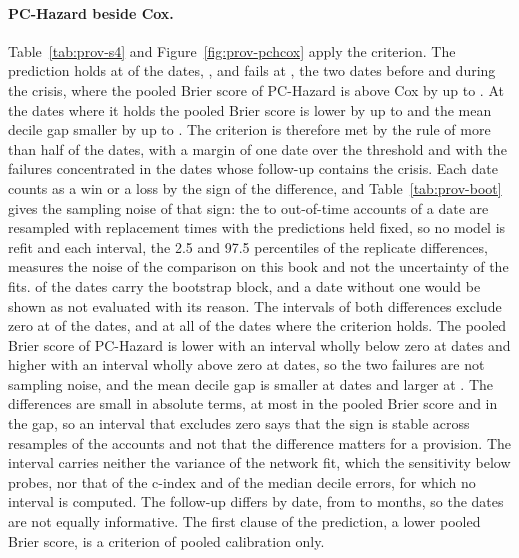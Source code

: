 \paragraph{PC-Hazard beside Cox.} Table~\ref{tab:prov-s4} and Figure~\ref{fig:prov-pchcox} apply the criterion. The prediction holds at \pvDatesHold{} of the \pvDatesTotal{} dates, \pvHoldDates{}, and fails at \pvFailDates{}, the two dates before and during the crisis, where the pooled Brier score of PC-Hazard is above Cox by up to \pvPbsWorseMax{}. At the dates where it holds the pooled Brier score is lower by up to
\pvPbsBetterMax{} and the mean decile gap smaller by up to \pvGapBetterMax{}. The criterion is therefore met by the rule of more than half of the dates, with a margin of one date over the threshold and with the failures concentrated in the dates whose follow-up contains the crisis. Each date counts as a win or a loss by the sign of the difference, and Table~\ref{tab:prov-boot} gives the sampling noise of that sign: the \pvBootAccountsMin{} to \pvBootAccountsMax{} out-of-time accounts of a date are resampled with replacement \pvBootReplicates{} times with the predictions held fixed, so no model is refit and each interval, the 2.5 and 97.5 percentiles of the replicate differences, measures the noise of the comparison on this book and not the uncertainty of the fits. \pvBootEvaluated{} of the \pvBootDates{} dates carry the bootstrap block, and a date without one would be shown as not evaluated with its reason. The intervals of both differences exclude zero at \pvBootBoth{} of the \pvDatesTotal{} dates, and at all \pvBootHoldsExcl{} of the \pvBootHolds{} dates where the criterion holds. The pooled Brier score of PC-Hazard is lower with an interval wholly below zero at \pvBootIbsBetter{} dates and higher with an interval wholly above zero at \pvBootIbsWorse{} dates, so the two failures are not sampling noise, and the mean decile gap is smaller at \pvBootGapBetter{} dates and larger at \pvBootGapWorse{}. The differences are small in absolute terms, at most \pvBootIbsAbsMax{} in the pooled Brier score and \pvBootGapAbsMax{} in the gap, so an interval that excludes zero says that the sign is stable across resamples of the accounts and not that the difference matters for a provision. The interval carries neither the variance of the network fit, which the sensitivity below probes, nor that of the c-index and of the median decile errors, for which no interval is computed. The follow-up differs by date, from \pvFollowShort{} to \pvFollowLong{} months, so the dates are not equally informative. The first clause of the prediction, a lower pooled Brier score, is a criterion of pooled calibration only.

